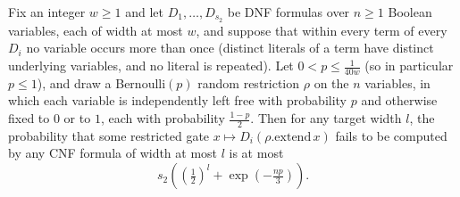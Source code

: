 \begin{theorem}
\label{LMN.one_step_reduction_failure_bound}
\leanok
{}
Fix an integer $w \ge 1$ and let $D_1, \dots, D_{s_2}$ be DNF formulas over $n \ge 1$
Boolean variables, each of width at most $w$, and suppose that within every term of
every $D_i$ no variable occurs more than once (distinct literals of a term have distinct
underlying variables, and no literal is repeated). Let $0 < p \le \tfrac{1}{40w}$ (so in
particular $p \le 1$), and draw a Bernoulli$(p)$ random restriction $\rho$ on the $n$
variables, in which each variable is independently left free with probability $p$ and
otherwise fixed to $0$ or to $1$, each with probability $\tfrac{1-p}{2}$. Then for any
target width $l$, the probability that some restricted gate $x \mapsto
D_i(\rho.\mathrm{extend}\,x)$ fails to be computed by any CNF formula of width at most
$l$ is at most
\[
  s_2\!\left( \left(\tfrac{1}{2}\right)^{l} + \exp\!\left(-\tfrac{np}{3}\right) \right).
\]
\end{theorem}

